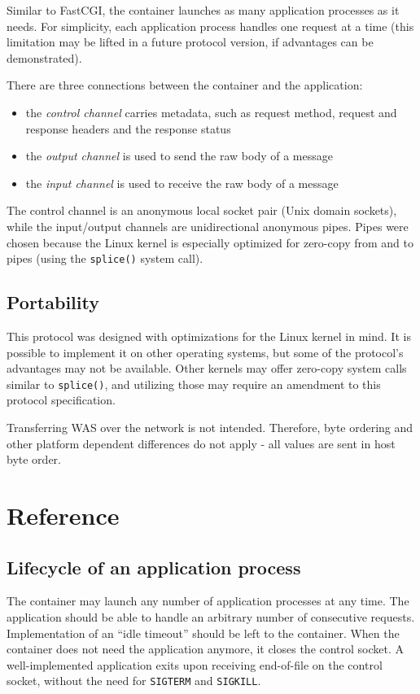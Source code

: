 \documentclass[a4paper,12pt]{article}
\begin{document}
Similar to FastCGI, the container launches as many application
processes as it needs.  For simplicity, each application process
handles one request at a time (this limitation may be lifted in a
future protocol version, if advantages can be demonstrated).

There are three connections between the container and the application:

\begin{itemize}
\item the \emph{control channel} carries metadata, such as request
  method, request and response headers and the response status
\item the \emph{output channel} is used to send the raw body of a
  message
\item the \emph{input channel} is used to receive the raw body of a
  message
\end{itemize}

The control channel is an anonymous local socket pair (Unix domain
sockets), while the input/output channels are unidirectional anonymous
pipes.  Pipes were chosen because the Linux kernel is especially
optimized for zero-copy from and to pipes (using the \texttt{splice()}
system call).

\subsection{Portability}

This protocol was designed with optimizations for the Linux kernel in
mind.  It is possible to implement it on other operating systems, but
some of the protocol's advantages may not be available.  Other kernels
may offer zero-copy system calls similar to \texttt{splice()}, and
utilizing those may require an amendment to this protocol
specification.

Transferring WAS over the network is not intended.  Therefore, byte
ordering and other platform dependent differences do not apply - all
values are sent in host byte order.

\section{Reference}

\subsection{Lifecycle of an application process}

The container may launch any number of application processes at any
time.  The application should be able to handle an arbitrary number of
consecutive requests.  Implementation of an ``idle timeout'' should be
left to the container.  When the container does not need the
application anymore, it closes the control socket.  A well-implemented
application exits upon receiving end-of-file on the control socket,
without the need for \texttt{SIGTERM} and \texttt{SIGKILL}.
\end{document}
